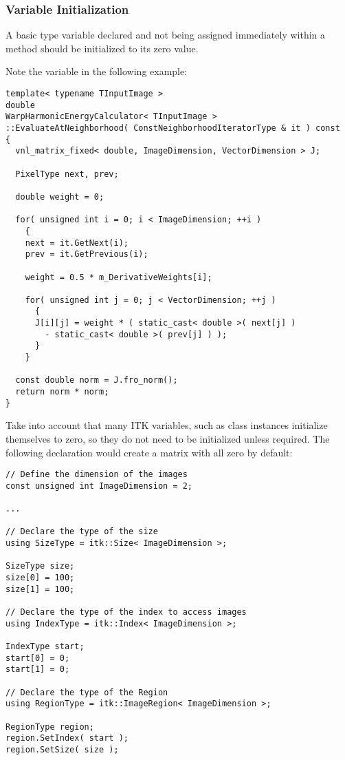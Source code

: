 \subsubsection{Variable Initialization}
\label{subsubsec:VariableInitialization}

A basic type variable declared and not being assigned immediately within a
method should be initialized to its zero value.

Note the  variable in the following example:

\small
\begin{verbatim}
template< typename TInputImage >
double
WarpHarmonicEnergyCalculator< TInputImage >
::EvaluateAtNeighborhood( ConstNeighborhoodIteratorType & it ) const
{
  vnl_matrix_fixed< double, ImageDimension, VectorDimension > J;

  PixelType next, prev;

  double weight = 0;

  for( unsigned int i = 0; i < ImageDimension; ++i )
    {
    next = it.GetNext(i);
    prev = it.GetPrevious(i);

    weight = 0.5 * m_DerivativeWeights[i];

    for( unsigned int j = 0; j < VectorDimension; ++j )
      {
      J[i][j] = weight * ( static_cast< double >( next[j] )
        - static_cast< double >( prev[j] ) );
      }
    }

  const double norm = J.fro_norm();
  return norm * norm;
}
\end{verbatim}
\normalsize

Take into account that many ITK variables, such as  class
instances initialize themselves to zero, so they do not need to be initialized
unless required. The following declaration would create a matrix with all zero
by default:

\small
\begin{verbatim}
// Define the dimension of the images
const unsigned int ImageDimension = 2;

...

// Declare the type of the size
using SizeType = itk::Size< ImageDimension >;

SizeType size;
size[0] = 100;
size[1] = 100;

// Declare the type of the index to access images
using IndexType = itk::Index< ImageDimension >;

IndexType start;
start[0] = 0;
start[1] = 0;

// Declare the type of the Region
using RegionType = itk::ImageRegion< ImageDimension >;

RegionType region;
region.SetIndex( start );
region.SetSize( size );
\end{verbatim}
\normalsize


